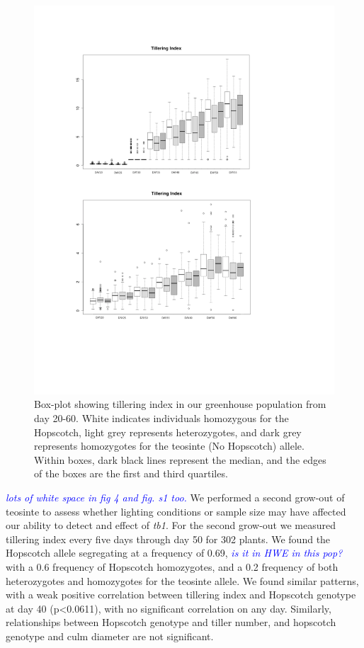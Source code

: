 \documentclass[12pt]{article}
\newcommand{\jri}[1]{\textcolor{blue}{ \emph{\scriptsize  #1}} }
\begin{document}
\begin{figure}[!t]
  \begin{center}
   \includegraphics[width=150mm]{Fig4Boxplots.pdf}
    \caption{Box-plot showing tillering index in our greenhouse population from day 20-60. White indicates individuals homozygous for the Hopscotch, light grey represents heterozygotes, and dark grey represents homozygotes for the teosinte (No Hopscotch) allele. Within boxes, dark black lines represent the median, and the edges of the boxes are the first and third quartiles.} 
\label{Fig4Boxplots}
  \end{center}
\end{figure}
\jri{lots of white space in fig 4 and fig. s1 too.} 
We performed a second grow-out  of teosinte to assess whether lighting conditions or sample size may have affected our ability to detect and effect of \emph{tb1}.  For the second grow-out we measured tillering index every five days through day 50 for 302 plants. We found the Hopscotch allele segregating at a frequency of 0.69, \jri{is it in HWE in this pop?} with a 0.6 frequency of Hopscotch homozygotes, and a 0.2 frequency of both heterozygotes and homozygotes for the teosinte allele. We found similar patterns, with a weak positive correlation between tillering index and Hopscotch genotype at day 40 (p<0.0611), with no significant correlation on any day. Similarly, relationships between Hopscotch genotype and tiller number, and hopscotch genotype and culm diameter are not significant. 
\end{document}
